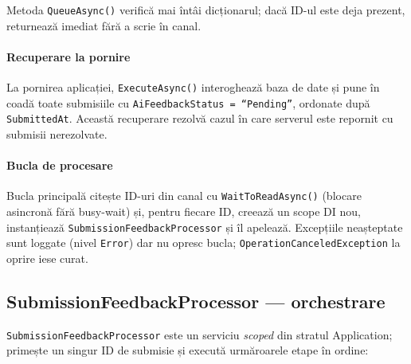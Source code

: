 Metoda \texttt{QueueAsync()} verifică mai întâi dicționarul; dacă ID-ul
este deja prezent, returnează imediat fără a scrie în canal.

\paragraph{Recuperare la pornire}
La pornirea aplicației, \texttt{ExecuteAsync()} interoghează baza de date
și pune în coadă toate submisiile cu \texttt{AiFeedbackStatus = ``Pending''},
ordonate după \texttt{SubmittedAt}. Această recuperare rezolvă cazul
în care serverul este repornit cu submisii nerezolvate.

\paragraph{Bucla de procesare}
Bucla principală citește ID-uri din canal cu
\texttt{WaitToReadAsync()} (blocare asincronă fără busy-wait) și,
pentru fiecare ID, creează un scope DI nou, instanțiează
\texttt{SubmissionFeedbackProcessor} și îl apelează. Excepțiile
neașteptate sunt loggate (nivel \texttt{Error}) dar nu opresc bucla;
\texttt{OperationCanceledException} la oprire iese curat.

\subsection{SubmissionFeedbackProcessor — orchestrare}

\texttt{SubmissionFeedbackProcessor} este un serviciu \emph{scoped} din
stratul Application; primește un singur ID de submisie și execută
urmăroarele etape în ordine:

